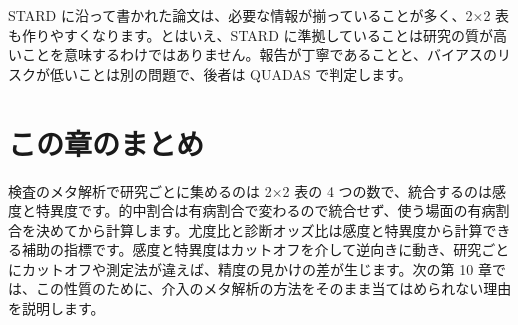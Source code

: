 STARD に沿って書かれた論文は、必要な情報が揃っていることが多く、2×2 表も作りやすくなります。とはいえ、STARD に準拠していることは研究の質が高いことを意味するわけではありません。報告が丁寧であることと、バイアスのリスクが低いことは別の問題で、後者は QUADAS で判定します。

\section{この章のまとめ}
\label{sec:09-8}

検査のメタ解析で研究ごとに集めるのは 2×2 表の 4 つの数で、統合するのは感度と特異度です。的中割合は有病割合で変わるので統合せず、使う場面の有病割合を決めてから計算します。尤度比と診断オッズ比は感度と特異度から計算できる補助の指標です。感度と特異度はカットオフを介して逆向きに動き、研究ごとにカットオフや測定法が違えば、精度の見かけの差が生じます。次の第 10 章では、この性質のために、介入のメタ解析の方法をそのまま当てはめられない理由を説明します。
